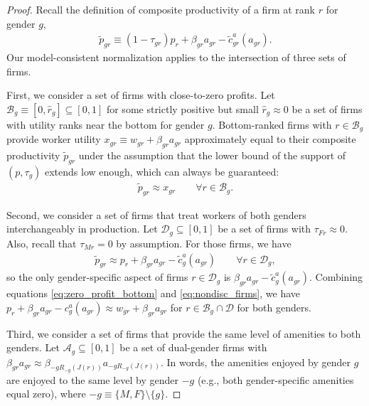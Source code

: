 \begin{proof}
    Recall the definition of composite productivity of a firm at rank $r$ for gender $g$,
    \begin{align}
        \tilde{p}_{gr} \equiv (1 - \tau_{gr}) p_{r} + \beta_{gr} a_{gr} - \tilde{c}_{gr}^{a}(a_{gr}). \label{eq:reminder_ptilde}
    \end{align}
    Our model-consistent normalization applies to the intersection of three sets of firms.

    First, we consider a set of firms with close-to-zero profits. Let $\mathcal{B}_{g} \equiv [0, \hat{r}_{g}] \subseteq [0, 1]$ for some strictly positive but small $\hat{r}_{g} \approx 0$ be a set of firms with utility ranks near the bottom for gender $g$. Bottom-ranked firms with $r \in \mathcal{B}_{g}$ provide worker utility $x_{gr} \equiv w_{gr} + \beta_{gr} a_{gr}$ approximately equal to their composite productivity $\tilde{p}_{gr}$ under the assumption that the lower bound of the support of $(p, \tau_{g})$ extends low enough, which can always be guaranteed:
    \begin{align}
        \tilde{p}_{gr} \approx x_{gr} \qquad \forall r \in \mathcal{B}_{g}. \label{eq:zero_profit_bottom}
    \end{align}

    Second, we consider a set of firms that treat workers of both genders interchangeably in production. Let $\mathcal{D}_{g} \subseteq [0,1]$ be a set of firms with $\tau_{Fr} \approx 0$. Also, recall that $\tau_{Mr} = 0$ by assumption. For those firms, we have
    \begin{align}
        \tilde{p}_{gr} \approx p_{r} + \beta_{gr} a_{gr} - \tilde{c}_{g}^{a}(a_{gr}) \qquad \forall r \in \mathcal{D}_{g}, \label{eq:nondisc_firms}
    \end{align}
    so the only gender-specific aspect of firms $r \in \mathcal{D}_{g}$ is $\beta_{gr} a_{gr} - \tilde{c}_{g}^{a}(a_{gr})$. Combining equations \eqref{eq:zero_profit_bottom} and \eqref{eq:nondisc_firms}, we have $p_{r} + \beta_{gr} a_{gr} - c_{g}^{a}(a_{gr}) \approx w_{gr} + \beta_{gr} a_{gr}$ for $r \in \mathcal{B}_{g} \cap \mathcal{D}$ for both genders.

    Third, we consider a set of firms that provide the same level of amenities to both genders. Let $\mathcal{A}_{g} \subseteq [0,1]$ be a set of dual-gender firms with $\beta_{gr} a_{gr} \approx \beta_{-gR_{-g}(J(r))} a_{-gR_{-g}(J(r))}$. In words, the amenities enjoyed by gender $g$ are enjoyed to the same level by gender $-g$ (e.g., both gender-specific amenities equal zero), where $-g \equiv \{ M, F \} \setminus \{ g \}$.


\end{proof}
